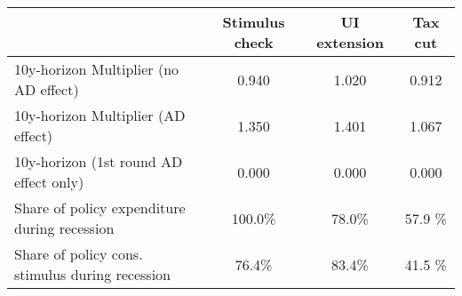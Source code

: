 \begin{tabular}{@{}lccc@{}} 
\toprule 
& Stimulus check    & UI extension    & Tax cut     \\  \midrule 
10y-horizon Multiplier (no AD effect) &0.940  & 1.020  & 0.912     \\ 
10y-horizon Multiplier (AD effect) &1.350  & 1.401  & 1.067     \\ 
10y-horizon (1st round AD effect only) &0.000  & 0.000  & 0.000     \\ 
Share of policy expenditure during recession &100.0\%  & 78.0\%  & 57.9 \%    \\ 
Share of policy cons. stimulus during recession &76.4\%  & 83.4\%  & 41.5 \%    \\ \bottomrule 
\end{tabular}  
